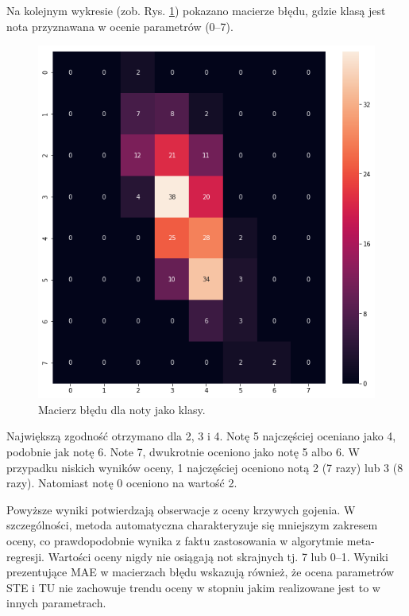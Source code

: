 Na kolejnym wykresie (zob. Rys. \ref{fig:cmscores}) pokazano macierze błędu, gdzie klasą jest nota przyznawana w ocenie parametrów (0--7).
\begin{figure}[t!]
	\centering
	\includegraphics[width=1\textwidth]{figures/cmScores.png}
	\caption{Macierz błędu dla noty jako klasy.}\label{fig:cmscores}
\end{figure}
Największą zgodność otrzymano dla 2, 3 i 4. Notę 5 najczęściej oceniano jako 4, podobnie jak notę 6. Note 7, dwukrotnie oceniono jako notę 5 albo 6. W przypadku niskich wyników oceny, 1 najczęściej oceniono notą 2 (7 razy) lub 3 (8 razy). Natomiast notę 0 oceniono na wartość 2.


Powyższe wyniki potwierdzają obserwacje z oceny krzywych gojenia. W szczególności, metoda automatyczna charakteryzuje się mniejszym zakresem oceny, co prawdopodobnie wynika z faktu zastosowania w algorytmie meta-regresji. Wartości oceny nigdy nie osiągają not skrajnych tj. 7 lub 0--1. Wyniki prezentujące MAE w macierzach błędu wskazują również, że ocena parametrów STE i TU nie zachowuje trendu oceny w stopniu jakim realizowane jest to w innych parametrach.
